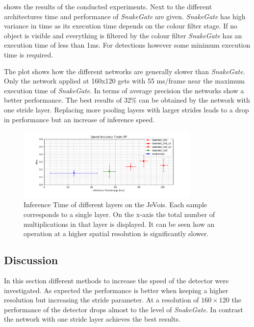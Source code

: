  shows the results of the conducted experiments. Next to the different architectures time and performance of \textit{SnakeGate} are given. \textit{SnakeGate} has high variance in time as its execution time depends on the colour filter stage. If no object is visible and everything is filtered by the colour filter  \textit{SnakeGate} has an execution time of less than 1ms. For detections however some minimum execution time is required.

The plot shows how the different networks are generally slower than \textit{SnakeGate}. Only the network applied at 160x120 gets with 55 ms/frame near the maximum execution time of \textit{SnakeGate}. In terms of average precision the networks show a better performance. The best results of 32\% can be obtained by the network with one stride layer. Replacing more pooling layers with larger strides leads to a drop in performance but an increase of inference speed.

\begin{figure}[hbtp]
	\centering
	\includegraphics[width=0.8\textwidth]{fig/ap_speed_tradeoff}
	\caption{Inference Time of different layers on the JeVois. Each sample corresponds to a single layer. On the x-axis the total number of multiplications in that layer is displayed. It can be seen how an operation at a higher spatial resolution is significantly slower.}
	\label{fig:ap_speed_tradeoff}
\end{figure}


\subsection{Discussion}

In this section different methods to increase the speed of the detector were investigated. As expected the performance is better when keeping a higher resolution but increasing the stride parameter. At a resolution of $160\times120$ the performance of the detector drops almost to the level of \textit{SnakeGate}. In contrast the network with one stride layer achieves the best results.

